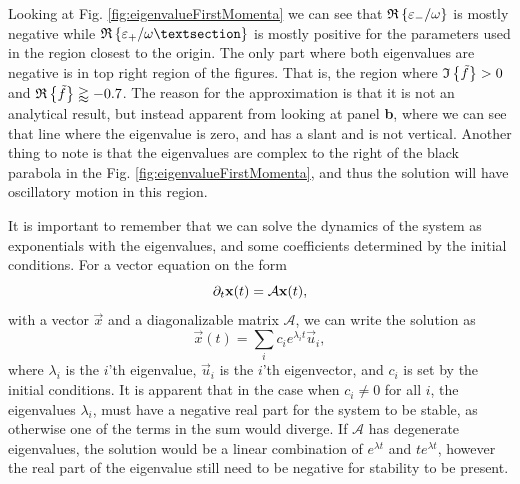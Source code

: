 Looking at Fig. \ref{fig:eigenvalueFirstMomenta} we can see that $\mathfrak{R}\left\{\varepsilon_- / \omega\right\}$ is mostly negative while $\re{\varepsilon_+ / \omega§}$ is mostly positive for the parameters used in the region closest to the origin. The only part where both eigenvalues are negative is in top right region of the figures. That is, the region where $\mathfrak{I}\left\{\tilde{f}\right\} > 0$ and $\mathfrak{R}\left\{\tilde{f}\right\} \gtrapprox -0.7$. The reason for the approximation is that it is not an analytical result, but instead apparent from looking at panel \textbf{b}, where we can see that line where the eigenvalue is zero, and has a slant and is not vertical. Another thing to note is that the eigenvalues are complex to the right of the black parabola in the Fig. \ref{fig:eigenvalueFirstMomenta}, and thus the solution will have oscillatory motion in this region.

It is important to remember that we can solve the dynamics of the system as exponentials with the eigenvalues, and some coefficients determined by the initial conditions. For a vector equation on the form
\begin{equation}
    \partial_t \mathbf{x}(t) = \mathcal{A}\mathbf{x}(t),
\end{equation}
with a vector $\vec{x}$ and a diagonalizable matrix $\mathcal{A}$, we can write the solution as
\begin{equation}
    \vec{x}(t) = \sum_i c_i e^{\lambda_i t} \vec{u}_i,
\end{equation}
where $\lambda_i$ is the $i$'th eigenvalue, $\vec{u}_i$ is the $i$'th eigenvector, and $c_i$ is set by the initial conditions. It is apparent that in the case when $c_i \neq 0$ for all $i$, the eigenvalues $\lambda_i$, must have a negative real part for the system to be stable, as otherwise one of the terms in the sum would diverge. If $\mathcal{A}$ has degenerate eigenvalues, the solution would be a linear combination of $e^{\lambda t} $ and $t e^{\lambda t}$, however the real part of the eigenvalue still need to be negative for stability to be present.



